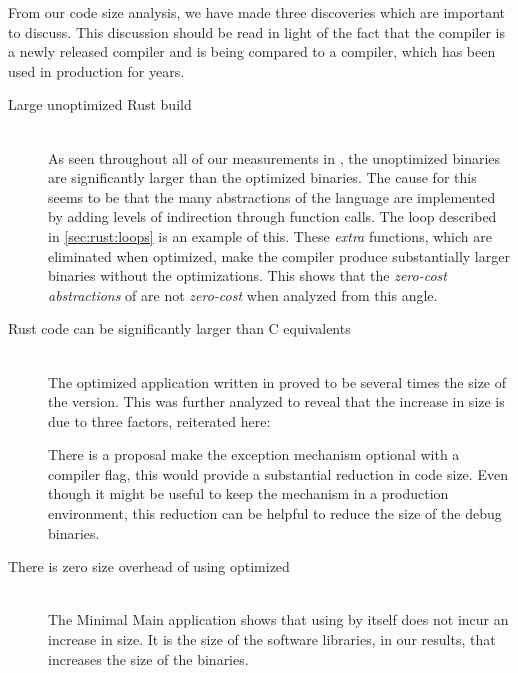 From our code size analysis, we have made three discoveries which are important to discuss.
This discussion should be read in light of the fact that the {\rust} compiler is a newly released compiler and is being compared to a {\C} compiler, which has been used in production for years.

\begin{description}

\item [Large unoptimized Rust build] \hfill \\
  As seen throughout all of our measurements in {\rust}, the unoptimized binaries are significantly larger than the optimized binaries.
  The cause for this seems to be that the many abstractions of the {\rust} language are implemented by adding levels of indirection through function calls.
  The  loop described in \autoref{sec:rust:loops} is an example of this.
  These \emph{extra} functions, which are eliminated when optimized, make the compiler produce substantially larger binaries without the optimizations.
  This shows that the \emph{zero-cost abstractions} of {\rust} are not \emph{zero-cost} when analyzed from this angle.

\item [Rust code can be significantly larger than C equivalents] \hfill \\
  The optimized {\tracker} application written in {\rust} proved to be several times the size of the {\C} version.
  This was further analyzed to reveal that the increase in size is due to three factors, reiterated here:
\begin{itemize}
\item The application code itself
\item The {\rust} Library
\item {\rust} exception mechanism (unwind)}
\end{itemize}
There is a proposal make the exception mechanism optional with a compiler flag, this would provide a substantial reduction in code size.
Even though it might be useful to keep the mechanism in a production environment, this reduction can be helpful to reduce the size of the debug binaries.

\item [There is zero size overhead of using optimized {\rust}] \hfill \\
  The Minimal Main application shows that using {\rust} by itself does not incur an increase in size.
  It is the size of the software libraries, in our results, that increases the size of the {\rust} binaries.

\end{description}

